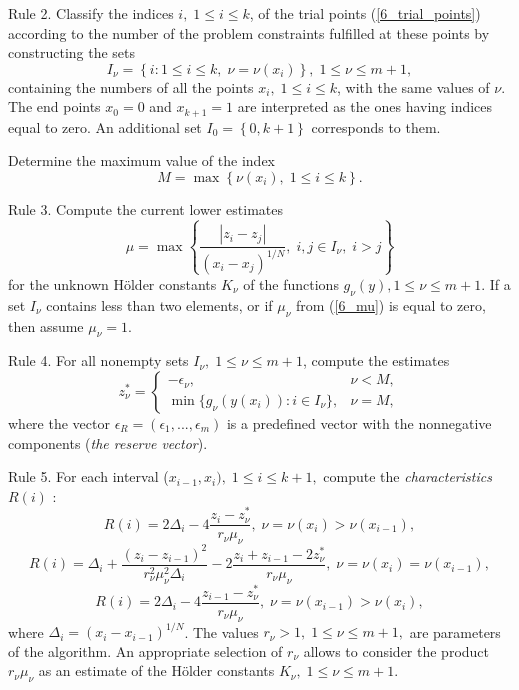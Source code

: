 Rule 2. Classify the indices $i, \; 1 \leq i \leq k$, of the trial points (\ref{6_trial_points})
according to the number of the problem constraints fulfilled at these points by constructing the sets
\[
I_\nu =\left\{i:1 \leq i \leq k, \; \nu=\nu(x_i) \right\}, \; 1 \leq \nu \leq m+1,
\]
containing the numbers of all the points $x_i, \; 1 \leq i \leq k$, with
the same values of $\nu$. The end points $x_0=0$ and $x_{k+1}=1$ are
interpreted as the ones having indices equal to zero. An additional set $I_0=\left\{0,k+1\right\}$ corresponds to them.

Determine the maximum value of the index
\[
M=\max\left\{\nu(x_i), \; 1 \leq i \leq k \right \}.
\]

Rule 3. Compute the current lower estimates
\begin{equation}\label{6_mu}
\mu = \max\left\{ \frac{\left|z_i-z_j\right|}{ (x_i - x_j)^{1/N} }, \; i,j \in I_\nu, \; i>j \right\}
\end{equation}
for the unknown H{\"o}lder constants $K_\nu$ of the functions $g_\nu(y),1
\leq \nu \leq m+1$. If a set $I_\nu$ contains less than two elements, or
if $\mu_\nu$ from (\ref{6_mu}) is equal to zero, then assume $\mu_\nu=1$.

Rule 4. For all nonempty sets $I_\nu, \; 1 \leq \nu \leq m+1$, compute the
estimates
\[
z_\nu^\ast = \left\{
   \begin{array}{lr}
     -\epsilon_\nu, & \nu < M,\\
     \min\{ g_\nu(y(x_i)): i\in I_\nu \}, & \nu = M,
   \end{array}
\right.
 \]
where the vector $\epsilon_R = (\epsilon_1,...,\epsilon_m)$ is a predefined vector with the nonnegative components (\textit{the reserve vector}).

Rule 5. For each interval ($x_{i-1},x_i), \; 1 \leq i \leq k+1,$ compute
the \textit{characteristics} $R(i)$ :
\[
R(i)=2\Delta_i-4\frac{z_i-z_\nu^\ast}{r_\nu \mu_\nu}, \; \nu=\nu(x_i)>\nu(x_{i-1}),
\]
\begin{equation}%
R(i)=\Delta_i+\frac{(z_i-z_{i-1})^2}{r_\nu^2 \mu_\nu^2\Delta_i}-2\frac{z_i+z_{i-1}-2z_\nu^\ast}{r_\nu \mu_\nu}, \;  \nu=\nu(x_i)=\nu(x_{i-1}),
\end{equation}
\[
R(i)=2\Delta_i-4\frac{z_{i-1}-z_\nu^\ast}{r_\nu \mu_\nu}, \; \nu=\nu(x_{i-1})>\nu(x_i),
\]
where $\Delta_i=(x_i - x_{i-1})^{1/N}$. The values $r_\nu > 1, \; 1 \leq
\nu \leq m+1,$ are parameters of the algorithm. An appropriate selection
of $r_\nu$ allows to consider the product $r_\nu \mu_\nu$ as an estimate
of the H{\"o}lder constants $K_\nu, \; 1 \leq \nu \leq m+1$.


